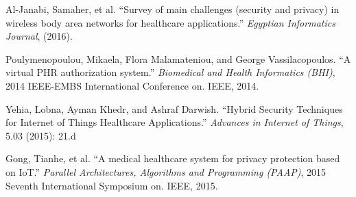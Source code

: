 \documentclass[letterpaper, 10 pt, conference]{ieeeconf}  %
\begin{document}
\begin{thebibliography}{99}

 Al-Janabi, Samaher, et al. ``Survey of main challenges (security and privacy) in wireless body area networks for healthcare applications.'' \emph{Egyptian Informatics Journal}, (2016).

 Poulymenopoulou, Mikaela, Flora Malamateniou, and George Vassilacopoulos. ``A virtual PHR authorization system.'' \emph{Biomedical and Health Informatics (BHI)}, 2014 IEEE-EMBS International Conference on. IEEE, 2014.

 Yehia, Lobna, Ayman Khedr, and Ashraf Darwish. ``Hybrid Security Techniques for Internet of Things Healthcare Applications.'' \emph{Advances in Internet of Things}, 5.03 (2015): 21.d

 Gong, Tianhe, et al. ``A medical healthcare system for privacy protection based on IoT.'' \emph{Parallel Architectures, Algorithms and Programming (PAAP)}, 2015 Seventh International Symposium on. IEEE, 2015.


\end{thebibliography}
\end{document}
